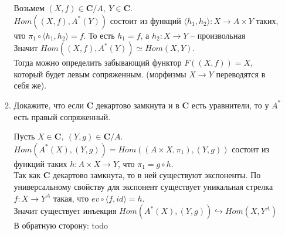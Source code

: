 \documentclass[draft]{article}
\newcommand{\cat}[1]{\mathbf{#1}}
\renewcommand{\C}{\cat{C}}
\begin{document}
\begin{enumerate}
\begin{enumerate}
Возьмем  $(X, f) \in \C/A,~Y \in \C$.\\
$Hom((X, f), A^*(Y))$ состоит из функций $\langle h_1, h_2\rangle : X \to A \times Y$ таких, что $\pi_1 \circ \langle h_1, h_2\rangle = f$. То есть $h_1 = f$, а $h_2 : X \to Y$ -- произвольная\\
Значит $Hom((X, f), A^*(Y)) \simeq Hom(X, Y)$. \\
Тогда можно определить забывающий функтор $F((X, f)) = X$, который будет левым сопряженным. (морфизмы $X \to Y$ переводятся в себя же).

\item Докажите, что если $\C$ декартово замкнута и в $\C$ есть уравнители, то у $A^*$ есть правый сопряженный.

Пусть $X \in \C,~(Y, g) \in \C/A$. \\
$Hom(A^*(X), (Y, g)) = Hom((A \times X, \pi_1), (Y, g))$ состоит из функций таких $h: A \times X \to Y$, что $\pi_1 = g \circ h$.\\
Так как $\C$ декартово замкнута, то в ней существуют экспоненты. По универсальному свойству для экспонент существует уникальная стрелка $f: X \to Y^A$ такая, что $ev \circ \langle f, id\rangle = h$.\\
Значит существует инъекция $Hom(A^*(X), (Y, g)) \hookrightarrow Hom(X, Y^A)$\\

В обратную сторону: todo

\end{enumerate}
\end{enumerate}
\end{document}

